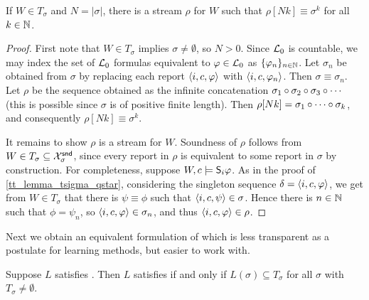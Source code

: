 \begin{lemma}
    \label{tt_lemma_pseudostream_to_stream}
    If $W \in T_\sigma$ and $N = |\sigma|$, there is a stream $\rho$ for $W$
    such that $\rho[Nk] \equiv \sigma^k$ for all $k \in \N$.
\end{lemma}

\begin{proof}

    First note that $W \in T_\sigma$ implies $\sigma \ne \emptyset$, so $N >
    0$. Since $\Lprop$ is countable, we may index the set of $\Lprop$ formulas
    equivalent to $\phi \in \Lprop$ as $\{\phi_n\}_{n \in \N}$. Let $\sigma_n$
    be obtained from $\sigma$ by replacing each report $\tuple{i, c, \phi}$
    with $\tuple{i, c, \phi_n}$. Then $\sigma \equiv \sigma_n$.
    Let $\rho$ be the sequence obtained as the infinite concatenation $\sigma_1
    \seqappend \sigma_2 \seqappend \sigma_3 \seqappend \cdots$ (this is
    possible since $\sigma$ is of positive finite length). Then $\rho[Nk] =
    \sigma_1 \seqappend \cdots \seqappend \sigma_k$, and consequently $\rho[Nk]
    \equiv \sigma^k$.

    It remains to show $\rho$ is a stream for $W$. Soundness of $\rho$ follows
    from $W \in T_\sigma \subseteq \Xsnd_\sigma$, since every report in $\rho$
    is equivalent to some report in $\sigma$ by construction. For completeness,
    suppose $W, c \models \S_i\phi$. As in the proof of
    \cref{tt_lemma_tsigma_qstar}, considering the singleton sequence $\delta =
    \tuple{i, c, \phi}$, we get from $W \in T_\sigma$ that there is $\psi
    \equiv \phi$ such that $\tuple{i, c, \psi} \in \sigma$. Hence there is $n
    \in \N$ such that $\phi = \psi_n$, so $\tuple{i, c, \phi} \in \sigma_n$,
    and thus $\tuple{i, c, \phi} \in \rho$.
\end{proof}

Next we obtain an equivalent formulation of
\credulity{} which is less transparent as a
postulate for learning methods, but easier to work with.

\begin{lemma}
    \label{tt_lemma_equivalent_tt_property}
    Suppose $L$ satisfies \soundness{}. Then $L$ satisfies
    \credulity{} if and only if $L(\sigma) \subseteq
    T_\sigma$ for all $\sigma$ with $T_\sigma \ne \emptyset$.
\end{lemma}

